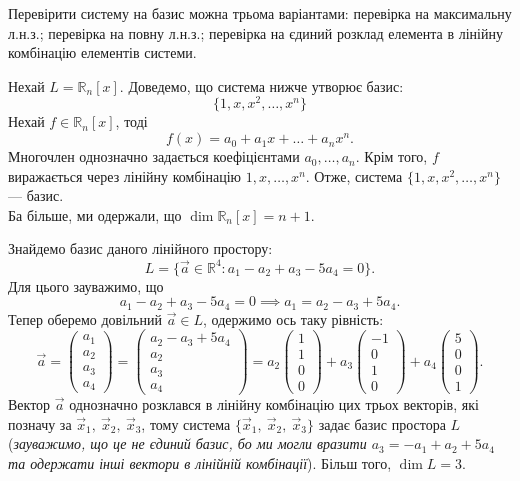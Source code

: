 \documentclass{math_library}
\begin{document}
	\begin{remark}
	Перевірити систему на базис можна трьома варіантами: перевірка на максимальну л.н.з.; перевірка на повну л.н.з.; перевірка на єдиний розклад елемента в лінійну комбінацію елементів системи.
	\end{remark}
	
	\begin{example}
	Нехай $L = \mathbb{R}_n[x]$. Доведемо, що система нижче утворює базис:
	\[
	\{1, x, x^2, \dots, x^n\}
	\] 
	Нехай $f \in \mathbb{R}_n[x]$, тоді
	\[
	f(x) = a_0 + a_1 x + \dots + a_n x^n.
	\] 
	Многочлен однозначно задається коефіцієнтами $a_0,\dots,a_n$. Крім того, $f$ виражається через лінійну комбінацію $1,x,\dots,x^n$. Отже, система  $\{1,x,x^2,\dots,x^n\}$ --- базис.\\
	Ба більше, ми одержали, що $\dim \mathbb{R}_n[x] = n+1$.
	\end{example}
	

	
	\begin{example}
	Знайдемо базис даного лінійного простору:
	\[
	L = \{\vec{a} \in \mathbb{R}^4: a_1 - a_2 + a_3 - 5a_4 = 0\}.
	\]
	Для цього зауважимо, що
	\[
	a_1 - a_2 + a_3 - 5a_4 = 0 \implies a_1 = a_2 - a_3 + 5a_4.
	\]
	Тепер оберемо довільний $\vec{a} \in L$, одержимо ось таку рівність:
	\[
	\vec{a} = \begin{pmatrix} a_1 \\ a_2 \\ a_3 \\ a_4 \end{pmatrix} = \begin{pmatrix} a_2 - a_3 + 5a_4 \\ a_2 \\ a_3 \\ a_4 \end{pmatrix} = a_2 \begin{pmatrix} 1 \\ 1 \\ 0 \\ 0\end{pmatrix} + a_3 \begin{pmatrix} -1 \\ 0 \\ 1 \\ 0\end{pmatrix} + a_4 \begin{pmatrix} 5 \\ 0 \\ 0 \\ 1 \end{pmatrix}.
	\]
	Вектор $\vec{a}$ однозначно розклався в лінійну комбінацію цих трьох векторів, які позначу за $\vec{x}_1,\ \vec{x}_2,\ \vec{x}_3$, тому система $\{\vec{x}_1,\ \vec{x}_2,\ \vec{x}_3\}$ задає базис простора $L$ (\textit{зауважимо, що це не єдиний базис, бо ми могли вразити $a_3 = -a_1 + a_2 + 5a_4$ та одержати інші вектори в лінійній комбінації}). Більш того, $\dim{L} = 3$.
	\end{example}
	
\end{document}
